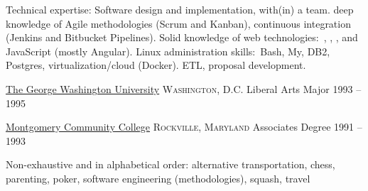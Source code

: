 \documentclass[10pt,a4paper]{article}
\begin{document}
{{    }
     \vspace{0.5em}
    {}

    
  }

\vspace{1em}

\spacedhrule{-0.2em}{-0.4em}


\inlineheadsection  %
  {Technical expertise:}
  {Software design and implementation, with(in) a team.  deep knowledge of Agile methodologies (Scrum and Kanban), continuous integration (Jenkins and Bitbucket Pipelines). Solid knowledge of web technologies:\ , , ,  and JavaScript (mostly Angular).  Linux administration skills:\ Bash, My, DB2, Postgres, virtualization/cloud (Docker). ETL, proposal development.}


\spacedhrule{2em}{-0.4em}


\headedsection
  {\href{https://www.gwu.edu}{The George Washington University}}
  {\textsc{Washington, D.C.}} {%
  \headedsubsection
    {Liberal Arts Major}
    {1993 -- 1995}
    {}
}

\headedsection
  {\href{https://www.montgomerycollege.edu}{Montgomery Community College}}
  {\textsc{Rockville, Maryland}} {%
  \headedsubsection
    {Associates Degree}
    {1991 -- 1993} {}
}

\vspace{0.5em}

\spacedhrule{1.6em}{-0.4em}


\inlineheadsection
  {Non-exhaustive and in alphabetical order:}
  {alternative transportation, chess, parenting, poker, software engineering (methodologies), squash, travel}
\end{document}
